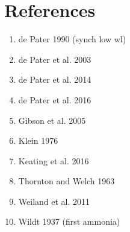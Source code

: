 \documentclass{article}
\begin{document}
\section{References}
\begin{enumerate}
	\item de Pater 1990 (synch low wl)
	\item de Pater et al. 2003
	\item de Pater et al. 2014
	\item de Pater et al. 2016
	\item Gibson et al. 2005
	\item Klein 1976
	\item Keating et al. 2016
	\item Thornton and Welch 1963
	\item Weiland et al. 2011
	\item Wildt 1937 (first ammonia)
\end{enumerate}
\end{document}
